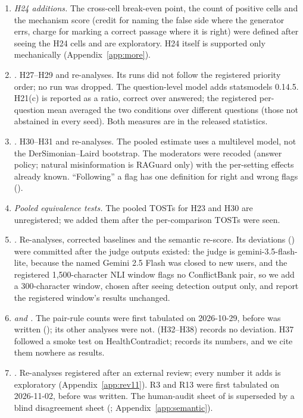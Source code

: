 \begin{enumerate}[leftmargin=*,itemsep=1pt,topsep=2pt]
$p$-values at their floor change, and only downward.
\item \emph{H24 additions.} The cross-cell break-even point, the count of positive cells and the mechanism score
(credit for naming the false side where the generator errs, charge for marking a correct passage where it is right)
were defined after seeing the H24 cells and are exploratory. H24 itself is supported only mechanically
(Appendix~\ref{app:more}).
\item \emph{.} H27--H29 and re-analyses. Its runs did not follow the registered priority order; no run was dropped.
The question-level model adds statsmodels 0.14.5. H21(c) is reported as a ratio, correct over answered; the
registered per-question mean averaged the two conditions over different questions (those not abstained in every
seed). Both measures are in the released statistics.
\item \emph{.} H30--H31 and re-analyses. The pooled estimate uses a multilevel model, not the
DerSimonian--Laird bootstrap. The moderators were recoded (answer policy; natural misinformation is RAGuard only)
with the per-setting effects already known. ``Following'' a flag has one definition for right and wrong flags
().
\item \emph{Pooled equivalence tests.} The pooled TOSTs for H23 and H30 are unregistered; we added them after the
per-comparison TOSTs were seen.
\item \emph{.} Re-analyses, corrected baselines and the semantic re-score. Its deviations () were
committed after the judge outputs existed: the judge is gemini-3.5-flash-lite, because the named Gemini 2.5 Flash was
closed to new users, and the registered 1,500-character NLI window flags no ConflictBank pair, so we add a 300-character
window, chosen after seeing detection output only, and report the registered window's results unchanged.
\item \emph{ and .} The  pair-rule counts were first tabulated on 2026-10-29, before  was
written (); its other analyses were not.  (H32--H38) records no deviation. H37 followed a smoke
test on HealthContradict;  records its numbers, and we cite them nowhere as results.
\item \emph{.} Re-analyses registered after an external review; every number it adds is exploratory
(Appendix~\ref{app:rev11}). R3 and R13 were first tabulated on 2026-11-02, before  was written. The
human-audit sheet of  is superseded by a blind disagreement sheet (; Appendix~\ref{app:semantic}).

\end{enumerate}
